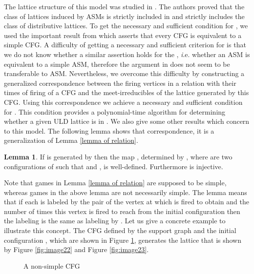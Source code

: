 \documentclass{article}
\theoremstyle{definition}
\newtheorem{lem}{Lemma}
\begin{document}
The lattice structure of this model was studied in \cite{Mag03}. The authors proved that the class of lattices induced by ASMs is strictly included in  and strictly includes the class of distributive lattices. To get the necessary and sufficient condition for , we used the important result from \cite{MVP01} which asserts that every CFG is equivalent to a simple CFG.  A difficulty of getting a necessary and sufficient criterion for  is that we do not know whether a similar assertion holds for the , {\emph i.e.} whether an ASM is equivalent to a simple ASM, therefore the argument in \cite{MVP01} does not seem to be transferable to ASM. Nevertheless, we overcome this difficulty by constructing a generalized correspondence between the firing vertices in a relation with their times of firing of a CFG  and the meet-irreducibles of the lattice generated by this CFG. Using this correspondence we achieve a necessary and sufficient condition for . This condition provides a polynomial-time algorithm for determining whether a given ULD lattice is in . We also give some other results which concern to this model. The following lemma shows that correspondence, it is a generalization of Lemma \ref{lemma of relation}.
\begin{lem}
\label{generalization of lemma of relation}
If  is generated by  then the map , determined by , where  are two configurations of  such that  and , is well-defined. Furthermore  is injective.  
\end{lem}
Note that games in Lemma \ref{lemma of relation} are supposed to be simple, whereas games in the above lemma are not necessarily simple. The lemma means that if each  is labeled by the pair of the vertex at which  is fired to obtain  and the number of times this vertex is fired to reach  from the initial configuration then the labeling is the same as  labeling  by . Let us give a concrete example to illustrate this concept. The CFG defined by the support graph  and the initial configuration , which are shown in Figure \ref{fig:image4546}, generates the lattice that is shown by Figure \ref{fig:image22} and Figure \ref{fig:image23}.
\begin{figure}[!h]
\centering
{}
\qquad \qquad
{}
\caption{A non-simple CFG}
\label{fig:image4546}
\end{figure}
\end{document}
